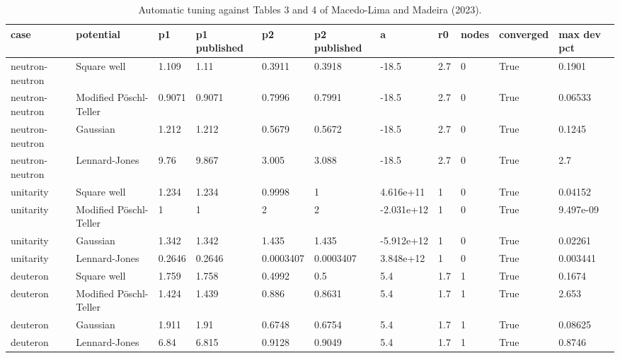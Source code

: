 \begin{table}[htbp]
\centering
\small
\caption{Automatic tuning against Tables 3 and 4 of Macedo-Lima and Madeira (2023).}
\label{tab:tuning}
\begin{tabular}{lllllllllll}
\hline
case & potential & p1 & p1 published & p2 & p2 published & a & r0 & nodes & converged & max dev pct \\
\hline
neutron-neutron & Square well & 1.109 & 1.11 & 0.3911 & 0.3918 & -18.5 & 2.7 & 0 & True & 0.1901\\
neutron-neutron & Modified Pöschl-Teller & 0.9071 & 0.9071 & 0.7996 & 0.7991 & -18.5 & 2.7 & 0 & True & 0.06533\\
neutron-neutron & Gaussian & 1.212 & 1.212 & 0.5679 & 0.5672 & -18.5 & 2.7 & 0 & True & 0.1245\\
neutron-neutron & Lennard-Jones & 9.76 & 9.867 & 3.005 & 3.088 & -18.5 & 2.7 & 0 & True & 2.7\\
unitarity & Square well & 1.234 & 1.234 & 0.9998 & 1 & 4.616e+11 & 1 & 0 & True & 0.04152\\
unitarity & Modified Pöschl-Teller & 1 & 1 & 2 & 2 & -2.031e+12 & 1 & 0 & True & 9.497e-09\\
unitarity & Gaussian & 1.342 & 1.342 & 1.435 & 1.435 & -5.912e+12 & 1 & 0 & True & 0.02261\\
unitarity & Lennard-Jones & 0.2646 & 0.2646 & 0.0003407 & 0.0003407 & 3.848e+12 & 1 & 0 & True & 0.003441\\
deuteron & Square well & 1.759 & 1.758 & 0.4992 & 0.5 & 5.4 & 1.7 & 1 & True & 0.1674\\
deuteron & Modified Pöschl-Teller & 1.424 & 1.439 & 0.886 & 0.8631 & 5.4 & 1.7 & 1 & True & 2.653\\
deuteron & Gaussian & 1.911 & 1.91 & 0.6748 & 0.6754 & 5.4 & 1.7 & 1 & True & 0.08625\\
deuteron & Lennard-Jones & 6.84 & 6.815 & 0.9128 & 0.9049 & 5.4 & 1.7 & 1 & True & 0.8746 \\
\hline
\end{tabular}
\end{table}
